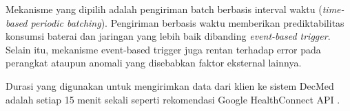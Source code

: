 Mekanisme yang dipilih adalah pengiriman batch berbasis interval waktu (\textit{time-based periodic batching}).
Pengiriman berbasis waktu memberikan prediktabilitas konsumsi baterai dan jaringan yang lebih baik dibanding \textit{event-based trigger}.
Selain itu, mekanisme event-based trigger juga rentan terhadap error pada perangkat ataupun anomali yang disebabkan faktor eksternal lainnya. %

Durasi yang digunakan untuk mengirimkan data dari klien ke sistem DecMed adalah setiap 15 menit sekali seperti rekomendasi Google HealthConnect API \parencite{android_hc_write}.